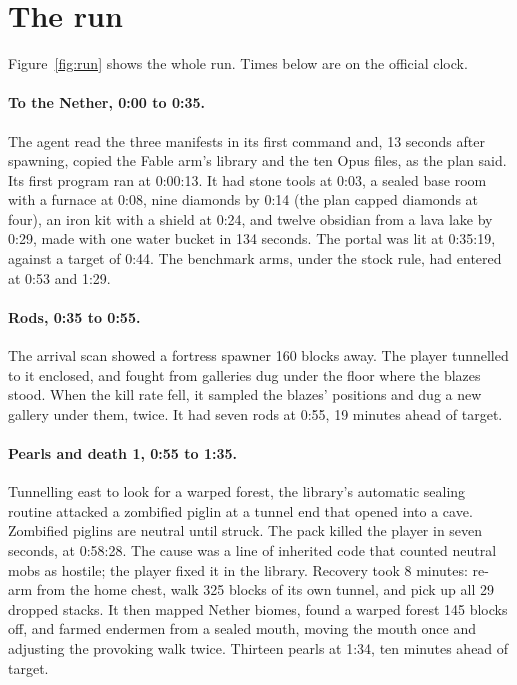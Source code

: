 \documentclass[11pt,a4paper]{article}
\begin{document}
\section{The run}
\label{sec:run}

Figure~\ref{fig:run} shows the whole run. Times below are on the official clock.

\paragraph{To the Nether, 0:00 to 0:35.} The agent read the three manifests in its first command and, 13 seconds after spawning, copied the Fable arm's library and the ten Opus files, as the plan said. Its first program ran at 0:00:13. It had stone tools at 0:03, a sealed base room with a furnace at 0:08, nine diamonds by 0:14 (the plan capped diamonds at four), an iron kit with a shield at 0:24, and twelve obsidian from a lava lake by 0:29, made with one water bucket in 134 seconds. The portal was lit at 0:35:19, against a target of 0:44. The benchmark arms, under the stock rule, had entered at 0:53 and 1:29.

\paragraph{Rods, 0:35 to 0:55.} The arrival scan showed a fortress spawner 160 blocks away. The player tunnelled to it enclosed, and fought from galleries dug under the floor where the blazes stood. When the kill rate fell, it sampled the blazes' positions and dug a new gallery under them, twice. It had seven rods at 0:55, 19 minutes ahead of target.

\paragraph{Pearls and death 1, 0:55 to 1:35.} Tunnelling east to look for a warped forest, the library's automatic sealing routine attacked a zombified piglin at a tunnel end that opened into a cave. Zombified piglins are neutral until struck. The pack killed the player in seven seconds, at 0:58:28. The cause was a line of inherited code that counted neutral mobs as hostile; the player fixed it in the library. Recovery took 8 minutes: re-arm from the home chest, walk 325 blocks of its own tunnel, and pick up all 29 dropped stacks. It then mapped Nether biomes, found a warped forest 145 blocks off, and farmed endermen from a sealed mouth, moving the mouth once and adjusting the provoking walk twice. Thirteen pearls at 1:34, ten minutes ahead of target.
\end{document}
